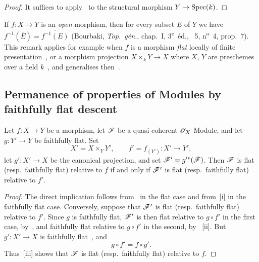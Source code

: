 \begin{proof}
It suffices to apply~ to the structural morphism $Y\to\operatorname{Spec}(k)$.
\end{proof}

\begin{remark}[2.4.11]
\label{IV.2.4.11}
If $f:X\to Y$ is an \emph{open} morphism, then for every subset $E$ of $Y$ we have $f^{-1}(\overline{E})=\overline{f^{-1}(E)}$ (Bourbaki, \emph{Top.~g\'{e}n.}, chap.~I, 3\textsuperscript{e}~\'{e}d., \textsection~5, n\textsuperscript{o}~4, prop.~7).
This remark applies for example when $f$ is a morphism \emph{flat} locally of finite presentation~, or a morphism projection $X\times_k Y\to X$ where $X$, $Y$ are preschemes over a field $k$~, and generalises then~.
\end{remark}

\subsection{Permanence of properties of Modules by faithfully flat descent}
\label{subsection:IV.2.5}

\begin{proposition}[2.5.1]
\label{IV.2.5.1}
Let $f:X\to Y$ be a morphism, let $\mathscr{F}$ be a quasi-coherent
$\mathscr{O}_X$-Module, and let $g:Y'\to Y$ be faithfully flat. Set
\[
  X'=X\times_Y Y',\qquad
  f'=f_{(Y')}:X'\to Y',
\]
let $g':X'\to X$ be the canonical projection, and set
$\mathscr{F}'=g'^*(\mathscr{F})$. Then $\mathscr{F}$ is flat \textnormal{(}resp.\
faithfully flat\textnormal{)} relative to $f$ if and only if $\mathscr{F}'$ is
flat \textnormal{(}resp.\ faithfully flat\textnormal{)} relative to $f'$.
\end{proposition}

\begin{proof}
The direct implication follows from~ in the flat case and
from~\sref{IV.2.2.11}[i] in the faithfully flat case. Conversely, suppose
that $\mathscr{F}'$ is flat \textnormal{(}resp.\ faithfully flat\textnormal{)}
relative to $f'$. Since $g$ is faithfully flat, $\mathscr{F}'$ is then flat
relative to $g\circ f'$ in the first case, by~\sref{IV.2.1.6}, and
faithfully flat relative to $g\circ f'$ in the second, by
~[ii]. But $g':X'\to X$ is faithfully
flat~, and
\[
  g\circ f'=f\circ g'.
\]
Thus~[iii] shows that $\mathscr{F}$ is flat
\textnormal{(}resp.\ faithfully flat\textnormal{)} relative to $f$.
\end{proof}


